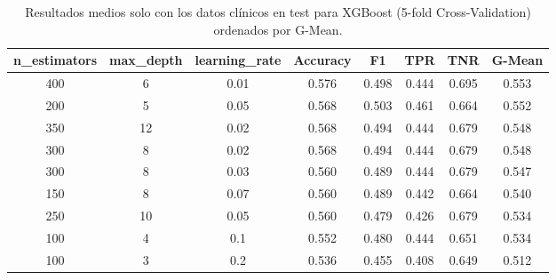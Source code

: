 \begin{table}[!htbp]
\centering
\caption{Resultados medios solo con los datos clínicos en test para XGBoost (5-fold Cross-Validation) ordenados por G-Mean.}
\label{tab:resultados-xgboost}
\begin{tabular}{cccccccc}
\toprule
\textbf{n\_estimators} & \textbf{max\_depth} & \textbf{learning\_rate} & \textbf{Accuracy} & \textbf{F1} & \textbf{TPR} & \textbf{TNR} & \textbf{G-Mean} \\
\midrule
400 & 6  & 0.01 & 0.576 & 0.498 & 0.444 & 0.695 & 0.553 \\
200 & 5  & 0.05 & 0.568 & 0.503 & 0.461 & 0.664 & 0.552 \\
350 & 12 & 0.02 & 0.568 & 0.494 & 0.444 & 0.679 & 0.548 \\
300 & 8  & 0.02 & 0.568 & 0.494 & 0.444 & 0.679 & 0.548 \\
300 & 8  & 0.03 & 0.560 & 0.489 & 0.444 & 0.679 & 0.547 \\
150 & 8  & 0.07 & 0.560 & 0.489 & 0.442 & 0.664 & 0.540 \\
250 & 10 & 0.05 & 0.560 & 0.479 & 0.426 & 0.679 & 0.534 \\
100 & 4  & 0.1  & 0.552 & 0.480 & 0.444 & 0.651 & 0.534 \\
100 & 3  & 0.2  & 0.536 & 0.455 & 0.408 & 0.649 & 0.512 \\
\bottomrule
\end{tabular}
\end{table}


